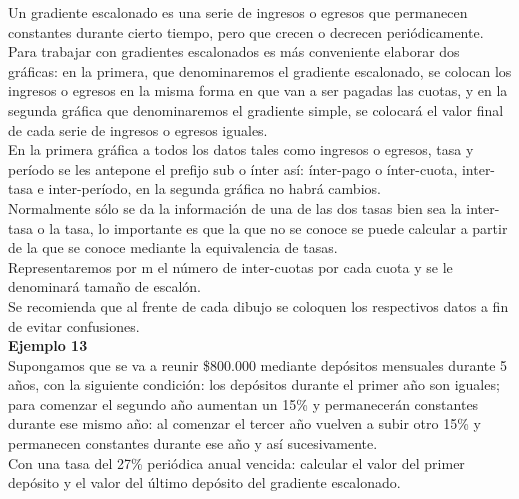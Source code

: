 	Un gradiente escalonado es una serie de ingresos o egresos que permanecen constantes durante cierto tiempo, pero 	que crecen o decrecen periódicamente.\\
	
	Para trabajar con gradientes escalonados es más conveniente elaborar dos gráficas: en la primera, que denominaremos el gradiente escalonado, se colocan los ingresos o egresos en la misma forma en que van a ser pagadas las cuotas, y en la segunda gráfica que denominaremos el gradiente simple, se colocará el valor final de cada serie de ingresos o egresos iguales.\\
	
	En la primera gráfica a todos los datos tales como ingresos o egresos, tasa y período se les antepone  el prefijo sub o ínter así: ínter-pago o ínter-cuota, inter-tasa e inter-período, en la segunda gráfica no habrá cambios.\\
	
	Normalmente sólo se da la información de una de las dos tasas bien sea la inter-tasa o la tasa, lo importante es que la que no se conoce se puede calcular a partir de la que se conoce mediante la equivalencia de tasas.\\
	
	Representaremos por m el número de inter-cuotas por cada cuota y se le denominará tamaño de escalón.\\
	
	Se recomienda que al frente de cada dibujo se coloquen los respectivos datos a fin de evitar confusiones.\\
	
	\textbf{Ejemplo 13}\\
	Supongamos que se va a reunir \$800.000 mediante depósitos mensuales durante 5 años, con la siguiente condición: los depósitos durante el primer año son iguales; para comenzar el segundo año aumentan un 15\% y permanecerán constantes durante ese mismo año: al comenzar el tercer año vuelven a subir otro 15\% y permanecen constantes durante ese año y así sucesivamente.\\
	Con una tasa del 27\% periódica anual vencida: calcular el valor del primer depósito y el valor del último depósito del gradiente escalonado.\\
	
